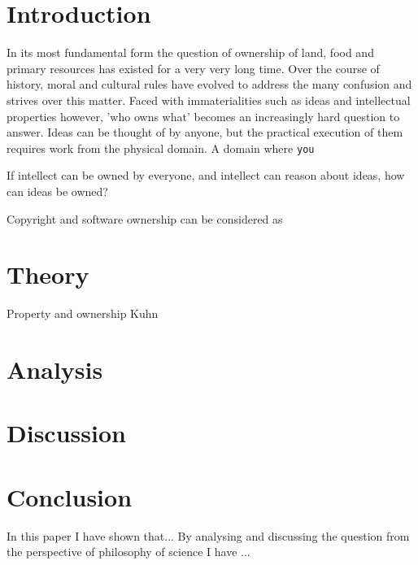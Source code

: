 \documentclass{article}
\begin{document}
\section{Introduction}
In its most fundamental form the question of ownership
of land, food and primary resources has existed for a
very very long time. Over the course of history,
moral and cultural rules have evolved to address the
many confusion and strives over this matter.
Faced with immaterialities such as
ideas and intellectual properties however, 'who owns what' becomes
an increasingly hard question to answer. Ideas can be thought of
by anyone, but the practical execution of them requires work
from the physical domain. A domain where \texttt{you} 

If intellect can be
owned by everyone, and intellect can reason about ideas, how can
ideas be owned? 

Copyright and software ownership can be considered as 

\section{Theory}
Property and ownership
Kuhn

\section{Analysis}

\section{Discussion}

\section{Conclusion}
In this paper I have shown that...
By analysing and discussing the question from the perspective
of philosophy of science I have ...
\end{document}

